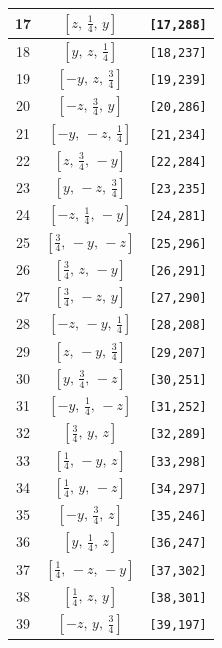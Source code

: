 \documentclass[fleqn,8pt]{jsarticle}
\begin{document}
\begin{longtable}{ccc}
17 & $\left[ z,\, \frac{1}{4},\, y \right]$ & {\tt [17,288]} \\ \hline
18 & $\left[ y,\, z,\, \frac{1}{4} \right]$ & {\tt [18,237]} \\ \hline
19 & $\left[ - y,\, z,\, \frac{3}{4} \right]$ & {\tt [19,239]} \\ \hline
20 & $\left[ - z,\, \frac{3}{4},\, y \right]$ & {\tt [20,286]} \\ \hline
21 & $\left[ - y,\, - z,\, \frac{1}{4} \right]$ & {\tt [21,234]} \\ \hline
22 & $\left[ z,\, \frac{3}{4},\, - y \right]$ & {\tt [22,284]} \\ \hline
23 & $\left[ y,\, - z,\, \frac{3}{4} \right]$ & {\tt [23,235]} \\ \hline
24 & $\left[ - z,\, \frac{1}{4},\, - y \right]$ & {\tt [24,281]} \\ \hline
25 & $\left[ \frac{3}{4},\, - y,\, - z \right]$ & {\tt [25,296]} \\ \hline
26 & $\left[ \frac{3}{4},\, z,\, - y \right]$ & {\tt [26,291]} \\ \hline
27 & $\left[ \frac{3}{4},\, - z,\, y \right]$ & {\tt [27,290]} \\ \hline
28 & $\left[ - z,\, - y,\, \frac{1}{4} \right]$ & {\tt [28,208]} \\ \hline
29 & $\left[ z,\, - y,\, \frac{3}{4} \right]$ & {\tt [29,207]} \\ \hline
30 & $\left[ y,\, \frac{3}{4},\, - z \right]$ & {\tt [30,251]} \\ \hline
31 & $\left[ - y,\, \frac{1}{4},\, - z \right]$ & {\tt [31,252]} \\ \hline
32 & $\left[ \frac{3}{4},\, y,\, z \right]$ & {\tt [32,289]} \\ \hline
33 & $\left[ \frac{1}{4},\, - y,\, z \right]$ & {\tt [33,298]} \\ \hline
34 & $\left[ \frac{1}{4},\, y,\, - z \right]$ & {\tt [34,297]} \\ \hline
35 & $\left[ - y,\, \frac{3}{4},\, z \right]$ & {\tt [35,246]} \\ \hline
36 & $\left[ y,\, \frac{1}{4},\, z \right]$ & {\tt [36,247]} \\ \hline
37 & $\left[ \frac{1}{4},\, - z,\, - y \right]$ & {\tt [37,302]} \\ \hline
38 & $\left[ \frac{1}{4},\, z,\, y \right]$ & {\tt [38,301]} \\ \hline
39 & $\left[ - z,\, y,\, \frac{3}{4} \right]$ & {\tt [39,197]} \\ \hline

\end{longtable}
\end{document}
